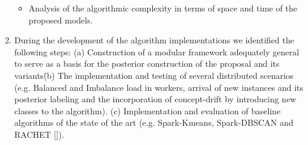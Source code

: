 \documentclass[10pt]{article}
\begin{document}
\begin{enumerate}
\begin{itemize}
\item Analysis of the algorithmic complexity in terms of space and time of the proposed models.
\end{itemize}
\item During the development of the algorithm implementations we identified the following steps: (a) Construction of a modular framework adequately general to serve as a basis for the posterior construction of the proposal and its variants\. (b) The implementation and testing of several distributed scenarios (e.g. Balanced and Imbalance load in workers, arrival of new instances and its posterior labeling and the incorporation of concept-drift by introducing new classes to the algorithm).
(c) Implementation and evaluation of baseline algorithms of the state of the art (e.g. Spark-Kmeans, Spark-DBSCAN and RACHET [\citep{SOGM02}]).%


\end{enumerate}
\end{document}
